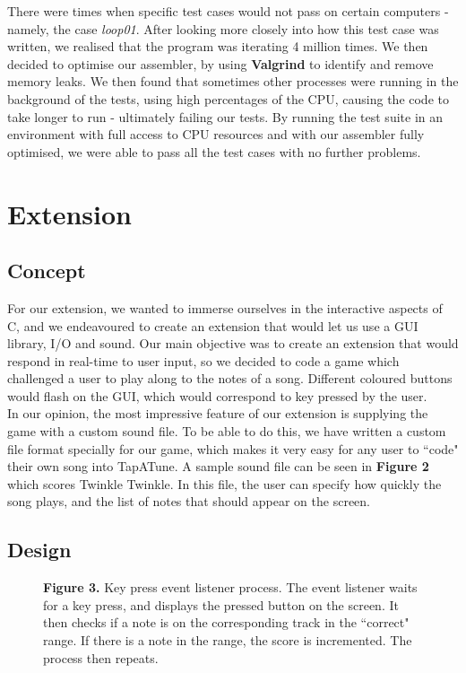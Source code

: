 \documentclass[11pt]{article}
\begin{document}
There were times when specific test cases would not pass on certain computers - namely, the case \emph{loop01}. After looking more closely into how this test case was written, we realised that the program was iterating 4 million times. We then decided to optimise our assembler, by using \textbf{Valgrind} to identify and remove memory leaks. We then found that sometimes other processes were running in the background of the tests, using high percentages of the CPU, causing the code to take longer to run - ultimately failing our tests. By running the test suite in an environment with full access to CPU resources and with our assembler fully optimised, we were able to pass all the test cases with no further problems.

\section{Extension}

\subsection{Concept}

For our extension, we wanted to immerse ourselves in the interactive aspects of C, and we endeavoured to create an extension that would let us use a GUI library, I/O and sound. Our main objective was to create an extension that would respond in real-time to user input, so we decided to code a game which challenged a user to play along to the notes of a song. Different coloured buttons would flash on the GUI, which would correspond to key pressed by the user.
\\ In our opinion, the most impressive feature of our extension is supplying the game with a custom sound file. To be able to do this, we have written a custom file format specially for our game, which makes it very easy for any user to ``code" their own song into TapATune. A sample sound file can be seen in \textbf{Figure 2} which scores Twinkle Twinkle. In this file, the user can specify how quickly the song plays, and the list of notes that should appear on the screen.

\subsection{Design}

\begin{wrapfigure}{R}{10em}
  \raggedleft
  
  \captionsetup{justification=justified,singlelinecheck=false}
  \caption*{\fontsize{9}{9}\selectfont \textbf{Figure 3.} Key press event listener process. The event listener waits for a key press, and displays the pressed button on the screen. It then checks if a note is on the corresponding track in the ``correct" range. If there is a note in the range, the score is incremented. The process then repeats.}
\end{wrapfigure}
\end{document}
